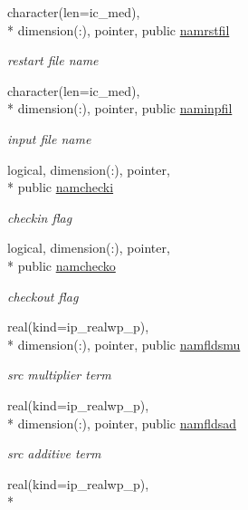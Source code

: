 \begin{DoxyCompactItemize}
character(len=ic\+\_\+med), \\*
dimension(\+:), pointer, public \hyperlink{classmod__oasis__namcouple_a54f4b8262f809a20928092782bc78345}{namrstfil}
\begin{DoxyCompactList}\small\item\em restart file name \end{DoxyCompactList}\item 
character(len=ic\+\_\+med), \\*
dimension(\+:), pointer, public \hyperlink{classmod__oasis__namcouple_a15fc11ff1c1d5718ff127a06a205a82c}{naminpfil}
\begin{DoxyCompactList}\small\item\em input file name \end{DoxyCompactList}\item 
logical, dimension(\+:), pointer, \\*
public \hyperlink{classmod__oasis__namcouple_a7c88a329c97aea020e9b135bdca8d160}{namchecki}
\begin{DoxyCompactList}\small\item\em checkin flag \end{DoxyCompactList}\item 
logical, dimension(\+:), pointer, \\*
public \hyperlink{classmod__oasis__namcouple_a58c011820e55c9af9f306fbb1d45eb23}{namchecko}
\begin{DoxyCompactList}\small\item\em checkout flag \end{DoxyCompactList}\item 
real(kind=ip\+\_\+realwp\+\_\+p), \\*
dimension(\+:), pointer, public \hyperlink{classmod__oasis__namcouple_ab52824ec91491253e02556a68ab31b09}{namfldsmu}
\begin{DoxyCompactList}\small\item\em src multiplier term \end{DoxyCompactList}\item 
real(kind=ip\+\_\+realwp\+\_\+p), \\*
dimension(\+:), pointer, public \hyperlink{classmod__oasis__namcouple_a1729dba99742412a1e07a479cb7f7921}{namfldsad}
\begin{DoxyCompactList}\small\item\em src additive term \end{DoxyCompactList}\item 
real(kind=ip\+\_\+realwp\+\_\+p), \\*

\end{DoxyCompactItemize}
